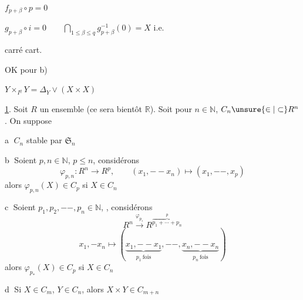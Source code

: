 $f_{p+\beta}\circ p=0$

$g_{p+\beta}\circ i=0\qquad\displaystyle\bigcap_{1\leq\beta\leq q}g_{p+\beta}^{-1}(0)=X$ i.e.

carré
cart.

OK pour b)

$Y\times_{I^q}Y=\Delta_Y\vee(X\times X)$



\uline{1}. Soit $R$ un ensemble (ce sera bientôt $\mathbb R$). 
Soit pour  $n\in\mathbb N$, $C_n\unsure{\in|\subset}R^n$. On suppose

\textcircled{a} $C_n$ stable par $\mathfrak S_n$

\textcircled{b} Soient $p,n\in\mathbb N$, $p\leq n$, considérons
\[
\varphi_{p,n}:R^n\longrightarrow R^p,\qquad
(x_1,--x_n)\longmapsto(x_1,--,x_p)
\]
alors $\varphi_{p,n}(X)\in C_p$ si $X\in C_n$

\textcircled{c} Soient $p_1,p_2,--,p_n\in\mathbb N$, , considérons
\[
R^n\xrightarrow{\varphi_{p_*}}R^{\overbrace{p_1+\cdots+p_n}^{p}}
\]
\[
x_1,-x_n\longmapsto
(\underbrace{x_1,--x_1}_{p_1\ \mathrm{fois}},--,\underbrace{x_n,--x_n}_{p_n\ \mathrm{fois}})
\]
alors $\varphi_{p_*}(X)\in C_p$ si $X\in C_n$

\textcircled{d} Si $X\in C_m$, $Y\in C_n$, alors $X\times Y\in C_{m+n}$

